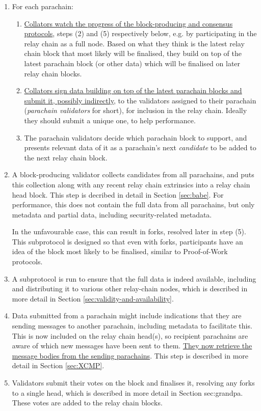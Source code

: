 \begin{enumerate}
\item For each parachain:

  \begin{enumerate}
    \item \uline{Collators watch the progress of the block-producing and consensus protocols}, steps (2) and (5) respectively below, e.g. by participating in the relay chain as a full node. Based on what they think is the latest relay chain block that most likely will be finalised, they build on top of the latest parachain block (or other data) which will be finalised on later relay chain blocks.
    \item \uline{Collators sign data building on top of the latest parachain blocks and submit it, possibly indirectly}, to the validators assigned to their parachain (\emph{parachain validators} for short), for inclusion in the relay chain. Ideally they should submit a unique one, to help performance.
    \item The parachain validators decide which parachain block to support, and presents relevant data of it as a parachain's next \emph{candidate} to be added to the next relay chain block.
  \end{enumerate}

\item A block-producing validator collects candidates from all parachains, and puts this collection along with any recent relay chain extrinsics into a relay chain head block. This step is decribed in detail in Section \ref{sec:babe}. For performance, this does not contain the full data from all parachains, but only metadata and partial data, including security-related metadata.

In the unfavourable case, this can result in forks, resolved later in step (5). This subprotocol is designed so that even with forks, participants have an idea of the block most likely to be finalised, similar to Proof-of-Work protocols.

\item A subprotocol is run to ensure that the full data is indeed available, including and distributing it to various other relay-chain nodes, which is described in more detail in Section \ref{sec:validity-and-availability}. 

\item Data submitted from a parachain might include indications that they are sending messages to another parachain, including metadata to facilitate this. This is now included on the relay chain head(s), so recipient parachains are aware of which new messages have been sent to them. \uline{They now retrieve the message bodies from the sending parachains}. This step is described in more detail in Section \ref{sec:XCMP}.

\item Validators submit their votes on the block and finalises it, resolving any forks to a single head, which is described in more detail in Section {sec:grandpa}. These votes are added to the relay chain blocks. 

\end{enumerate}

